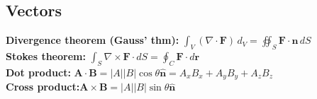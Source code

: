 \documentclass[letterpaper,landscape,10pt]{article}
\begin{document}
{\begin{multicols}{3}

	\subsection*{Vectors}
	\textbf{Divergence theorem (Gauss' thm):}
		$ \int_{V}(\nabla\cdot \mathbf{F}) \, d_{V} =
			\oiint_S \mathbf{F} \cdot \mathbf{n} \, dS $\\
	\textbf{Stokes theorem:}
	$ \int_S \nabla \times \mathbf{F} \cdot dS = \oint_C \mathbf{F}\cdot d\mathbf{r} $\\
	\textbf{Dot product:} $ \mathbf{A} \cdot \mathbf{B} = |A||B|\cos\theta\mathbf{\hat{n}} = A_xB_x+A_yB_y+A_zB_z$ \\
	\textbf{Cross product:}$ \mathbf{A} \times \mathbf{B} = |A||B|\sin\theta \mathbf{\hat{n}}  $\\



\end{multicols}}
\end{document}
